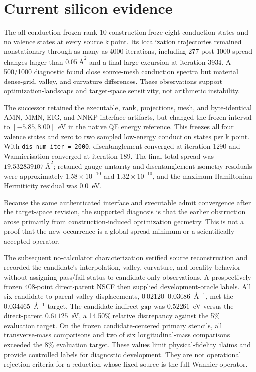 \documentclass[11pt]{article}
\begin{document}
\section{Current silicon evidence}

The all-conduction-frozen rank-10 construction froze eight conduction states and no
valence states at every source k point.  Its localization trajectories remained
nonstationary through as many as 4000 iterations, including 277 post-1000 spread changes
larger than $0.05\ \text{\AA}^{2}$ and a final large excursion at iteration 3934.  A
500/1000 diagnostic found close source-mesh conduction spectra but material dense-grid,
valley, and curvature differences.  These observations support optimization-landscape
and target-space sensitivity, not arithmetic instability.

The successor retained the executable, rank, projections, mesh, and byte-identical
AMN, MMN, EIG, and NNKP interface artifacts, but changed the frozen interval to
$[-5.85,8.00]$~eV in the native QE energy reference.  This freezes all four valence
states and zero to two sampled low-energy conduction states per k point.  With
\texttt{dis\_num\_iter = 2000}, disentanglement converged at iteration 1290 and
Wannierisation converged at iteration 189.  The final total spread was
$19.532839107\ \text{\AA}^{2}$; retained gauge-unitarity and disentanglement-isometry
residuals were approximately $1.58\times10^{-10}$ and $1.32\times10^{-10}$, and the
maximum Hamiltonian Hermiticity residual was $0.0$~eV.

Because the same authenticated interface and executable admit convergence after the
target-space revision, the supported diagnosis is that the earlier obstruction arose
primarily from construction-induced optimization geometry.  This is not a proof that
the new occurrence is a global spread minimum or a scientifically accepted operator.

The subsequent no-calculator characterization verified source reconstruction and
recorded the candidate's interpolation, valley, curvature, and locality behavior without
assigning pass/fail status to candidate-only observations.  A prospectively frozen
408-point direct-parent NSCF then supplied development-oracle labels.  All six
candidate-to-parent valley displacements, $0.02120$--$0.03086$~\AA$^{-1}$, met the
$0.034465$~\AA$^{-1}$ target.  The candidate indirect gap was $0.52261$~eV versus the
direct-parent $0.61125$~eV, a 14.50\% relative discrepancy against the 5\% evaluation
target.  On the frozen candidate-centered primary stencils, all transverse-mass
comparisons and two of six longitudinal-mass comparisons exceeded the 8\% evaluation
target.  These values limit physical-fidelity claims and provide controlled labels for
diagnostic development.  They are not operational rejection criteria for a reduction
whose fixed source is the full Wannier operator.
\end{document}
